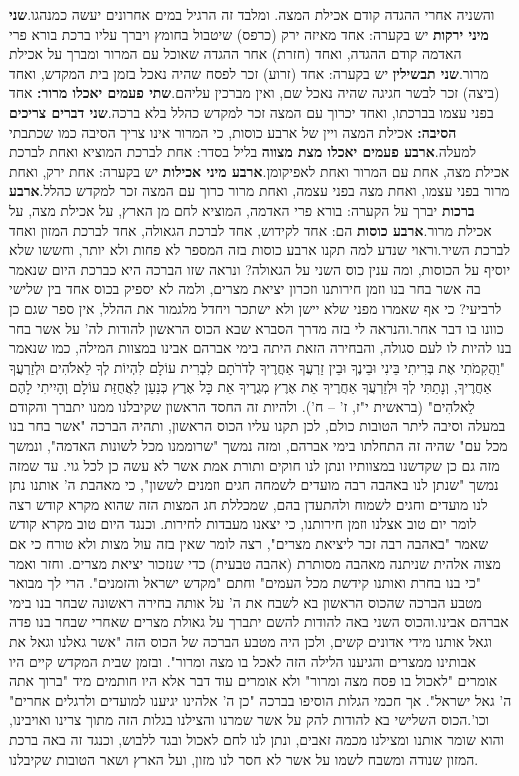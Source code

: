 \documentclass[12pt, openany]{book}
\begin{document}
והשניה אחרי ההגדה קודם אכילת המצה. ומלבד זה הרגיל במים אחרונים יעשה כמנהגו.\textrm{\textbf{שני מיני ירקות}} יש בקערה: אחד מאיזה ירק (כרפס) שיטבול בחומץ ויברך עליו ברכת בורא פרי האדמה קודם ההגדה, ואחד (חזרת) אחר ההגדה שאוכל עם המרור ומברך על אכילת מרור.\textrm{\textbf{שני תבשילין}} יש בקערה: אחד (זרוע) זכר לפסח שהיה נאכל בזמן בית המקדש, ואחד (ביצה) זכר לבשר חגיגה שהיה נאכל שם, ואין מברכין עליהם.\textrm{\textbf{שתי פעמים יאכלו מרור:}} אחד בפני עצמו בברכתו, ואחד יכרוך עם המצה זכר למקדש כהלל בלא ברכה.\textrm{\textbf{שני דברים צריכים הסיבה:}} אכילת המצה ויין של ארבע כוסות, כי המרור אינו צריך הסיבה כמו שכתבתי למעלה.\textrm{\textbf{ארבע פעמים יאכלו מצת מצווה}}  בליל בסדר: אחת לברכת המוציא ואחת לברכת אכילת מצה, אחת עם המרור ואחת לאפיקומן.\textrm{\textbf{ארבע מיני אכילות}}  יש בקערה: אחת ירק, ואחת מרור בפני עצמו, ואחת מצה בפני עצמה, ואחת מרור כרוך עם המצה זכר למקדש כהלל.\textrm{\textbf{ארבע ברכות}}  יברך על הקערה: בורא פרי האדמה, המוציא לחם מן הארץ, על אכילת מצה, על אכילת מרור.\textrm{\textbf{ארבע כוסות}} הם: אחד לקידוש, אחד לברכת הגאולה, אחד לברכת המזון ואחד לברכת השיר.וראוי שנדע למה תקנו ארבע כוסות בזה המספר לא פחות ולא יותר, וחששו שלא יוסיף על הכוסות, ומה ענין כוס השני על הגאולה? ונראה שזו הברכה היא כברכת היום שנאמר בה אשר בחר בנו וזמן חירותנו וזכרון יציאת מצרים, ולמה לא יספיק בכוס אחד בין שלישי לרביעי? כי אף שאמרו מפני שלא יישן ולא ישתכר ויחדל מלגמור את ההלל, אין ספר שגם כן כוונו בו דבר אחר.והנראה לי בזה מדרך הסברא שבא הכוס הראשון להודות לה' על אשר בחר בנו להיות לו לעם סגולה, והבחירה הזאת היתה בימי אברהם אבינו במצוות המילה, כמו שנאמר "וַהֲקִמֹתִי אֶת בְּרִיתִי בֵּינִי וּבֵינֶךָ וּבֵין זַרְעֲךָ אַחֲרֶיךָ לְדֹרֹתָם לִבְרִית עוֹלָם לִהְיוֹת לְךָ לֵאלֹהִים וּלְזַרְעֲךָ אַחֲרֶיךָ, וְנָתַתִּי לְךָ וּלְזַרְעֲךָ אַחֲרֶיךָ אֵת אֶרֶץ מְגֻרֶיךָ אֵת כָּל אֶרֶץ כְּנַעַן לַאֲחֻזַּת עוֹלָם וְהָיִיתִי לָהֶם לֵאלֹהִים" (בראשית י"ז, ז' – ח'). ולהיות זה החסד הראשון שקיבלנו ממנו יתברך והקודם במעלה וסיבה ליתר הטובות כולם, לכן תקנו עליו הכוס הראשון, ותהיה הברכה "אשר בחר בנו מכל עם" שהיה זה התחלתו בימי אברהם, ומזה נמשך "שרוממנו מכל לשונות האדמה", ונמשך מזה גם כן שקדשנו במצוותיו ונתן לנו חוקים ותורת אמת אשר לא עשה כן לכל גוי. עד שמזה נמשך "שנתן לנו באהבה רבה מועדים לשמחה חגים וזמנים לששון", כי מאהבת ה' אותנו נתן לנו מועדים וחגים לשמוח ולהתעדן בהם, שמכללת חג המצות הזה שהוא מקרא קודש רצה לומר יום טוב אצלנו וזמן חירותנו, כי יצאנו מעבדות לחירות. וכנגד היום טוב מקרא קודש שאמר "באהבה רבה זכר ליציאת מצרים", רצה לומר שאין בזה עול מצות ולא טורח כי אם מצוה אלהית שניתנה מאהבה מסותרת (אהבה טבעית) כדי שנזכור יציאת מצרים. וחזר ואמר "כי בנו בחרת ואותנו קידשת מכל העמים" וחתם "מקדש ישראל והזמנים". הרי לך מבואר מטבע הברכה שהכוס הראשון בא לשבח את ה' על אותה בחירה ראשונה שבחר בנו בימי אברהם אבינו.והכוס השני באה להודות להשם יתברך על גאולת מצרים שאחרי שבחר בנו פדה וגאל אותנו מידי אדונים קשים, ולכן היה מטבע הברכה של הכוס הזה "אשר גאלנו וגאל את אבותינו ממצרים והגיענו הלילה הזה לאכל בו מצה ומרור". ובזמן שבית המקדש קיים היו אומרים "לאכול בו פסח מצה ומרור" ולא אומרים עוד דבר אלא היו חותמים מיד "ברוך אתה ה' גאל ישראל". אך חכמי הגלות הוסיפו בברכה "כן ה' אלהינו יגיענו למועדים ולרגלים אחרים" וכו'.הכוס השלישי בא להודות להק על אשר שמרנו והצילנו בגלות הזה מתוך צרינו ואויבינו, והוא שומר אותנו ומצילנו מכמה זאבים, ונתן לנו  לחם לאכול ובגד ללבוש, וכנגד זה באה ברכת המזון שנודה ומשבח לשמו על אשר לא חסר לנו מזון, ועל הארץ ושאר הטובות שקיבלנו. 
\end{document}
